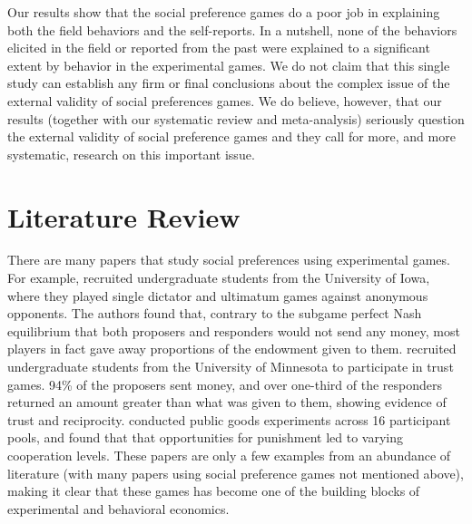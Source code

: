 \documentclass[12pt]{article}
\begin{document}
 {\color{red} Our results show that the social preference games do a poor job in explaining both the field behaviors and the self-reports. In a nutshell, none of the behaviors elicited in the field or reported from the past were explained to a significant extent by behavior in the experimental games. We do not claim that this single study can establish any firm or final conclusions about the complex issue of the external validity of social preferences games. We do believe, however, that our results (together with our systematic review and meta-analysis) seriously question the external validity of social preference games and they call for more, and more systematic, research on this important issue. }



\section{Literature Review}

There are many papers that study social preferences using experimental games. For example, \cite{forsythe_1994} recruited undergraduate students from the University of Iowa, where they played single dictator and ultimatum games against anonymous opponents. The authors found that, contrary to the subgame perfect Nash equilibrium that both proposers and responders would not send any money, most players in fact gave away proportions of the endowment given to them. \cite{berg_1995} recruited undergraduate students from the University of Minnesota to participate in trust games. 94\% of the proposers sent money, and over one-third of the responders returned an amount greater than what was given to them, showing evidence of trust and reciprocity. \cite{hermann_thoni_gachter_2008} conducted public goods experiments across 16 participant pools, and found that that opportunities for punishment led to varying cooperation levels. These papers are only a few examples from an abundance of literature (with many papers using social preference games not mentioned above), making it clear that these games has become one of the building blocks of experimental and behavioral economics. 
 
\end{document}
